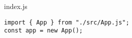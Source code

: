 \begin{listtitle}
index.js
\end{listtitle}
\begin{lstlisting}
import { App } from "./src/App.js";
const app = new App();
\end{lstlisting}
\listend
